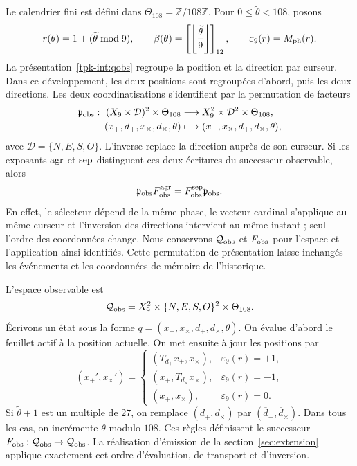 Le calendrier fini est défini dans \(\Theta_{108}=\mathbb Z/108\mathbb Z\). Pour \(0\leq\widetilde\theta<108\), posons
\[
 r(\theta)=1+(\widetilde\theta\bmod9),\qquad
 \beta(\theta)=\left[\left\lfloor\frac{\widetilde\theta}{9}
 \right\rfloor\right]_{12},\qquad
 \varepsilon_9(r)=M_{\rm ph}(r).
\]
La présentation~\eqref{tpk-int:qobs} regroupe la position et la direction par curseur. Dans ce développement, les deux positions sont regroupées d'abord, puis les deux directions. Les deux coordinatisations s'identifient par la permutation de facteurs
\begin{equation}
 \begin{aligned}
 \mathfrak p_{\rm obs}:\ (X_9\times\mathcal D)^2\times\Theta_{108}
 &\longrightarrow X_9^2\times\mathcal D^2\times\Theta_{108},\\
 (x_+,d_+,x_\times,d_\times,\theta)
 &\longmapsto(x_+,x_\times,d_+,d_\times,\theta),
 \end{aligned}
 \label{ii:permutacion-coordenadas-observables}
\end{equation}
avec \(\mathcal D=\{N,E,S,O\}\). L'inverse replace la direction auprès de son curseur. Si les exposants \({\rm agr}\) et \({\rm sep}\) distinguent ces deux écritures du successeur observable, alors
\[
 \mathfrak p_{\rm obs}F_{\rm obs}^{\rm agr}
 =F_{\rm obs}^{\rm sep}\mathfrak p_{\rm obs}.
\]
En effet, le sélecteur dépend de la même phase, le vecteur cardinal s'applique au même curseur et l'inversion des directions intervient au même instant ; seul l'ordre des coordonnées change. Nous conservons \(\mathcal Q_{\rm obs}\) et \(F_{\rm obs}\) pour l'espace et l'application ainsi identifiés. Cette permutation de présentation laisse inchangés les événements et les coordonnées de mémoire de l'historique.

L'espace observable est
\[
 \mathcal Q_{\rm obs}
 =X_9^2\times\{N,E,S,O\}^2\times\Theta_{108}.
\]
Écrivons un état sous la forme \(q=(x_+,x_\times,d_+,d_\times,\theta)\). On évalue d'abord le feuillet actif à la position actuelle. On met ensuite à jour les positions par
\begin{equation}
 (x_+',x_\times')=
 \begin{cases}
 (T_{d_+}x_+,x_\times),&\varepsilon_9(r)=+1,\\
 (x_+,T_{d_\times}x_\times),&\varepsilon_9(r)=-1,\\
 (x_+,x_\times),&\varepsilon_9(r)=0.
 \end{cases}
 \label{ii:tpk-fobs-posiciones}
\end{equation}
Si \(\widetilde\theta+1\) est un multiple de \(27\), on remplace \((d_+,d_\times)\) par \((\overline d_+,\overline d_\times)\). Dans tous les cas, on incrémente \(\theta\) modulo \(108\). Ces règles définissent le successeur \(F_{\rm obs}:\mathcal Q_{\rm obs}\to\mathcal Q_{\rm obs}\). La réalisation d'émission de la section~\ref{sec:extension} applique exactement cet ordre d'évaluation, de transport et d'inversion.

